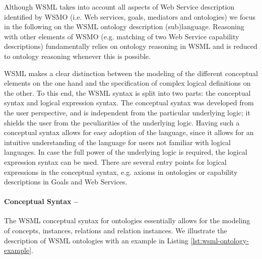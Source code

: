 Although WSML takes into account all aspects of Web Service
description identified by WSMO (i.e. Web services, goals,
mediators and ontologies) we focus in the following on the WSML
ontology description (sub)language. Reasoning with other elements
of WSMO (e.g. matching of two Web Service capability descriptions)
fundamentally relies on ontology reasoning in WSML and is reduced
to ontology reasoning whenever this is possible.

WSML makes a clear distinction between the modeling of the
different conceptual elements on the one hand and the
specification of complex logical definitions on the other. To this
end, the WSML syntax is split into two parts: the conceptual
syntax and logical expression syntax. The conceptual syntax was
developed from the user perspective, and is independent from the
particular underlying logic; it shields the user from the
peculiarities of the underlying logic. Having such a conceptual
syntax allows for easy adoption of the language, since it allows
for an intuitive understanding of the language for users not
familiar with logical languages. In case the full power of the
underlying logic is required, the logical expression syntax can be
used. There are several entry points for logical expressions in
the conceptual syntax, e.g. axioms in ontologies or capability
descriptions in Goals and Web Services.

\paragraph{\small Conceptual Syntax --}
\label{sec:conceptual-syntax}

The WSML conceptual syntax for ontologies essentially allows for
the modeling of concepts, instances, relations and relation
instances. %
We illustrate the description of WSML ontologies with an example in Listing
\ref{lst:wsml-ontology-example}.

%
%

